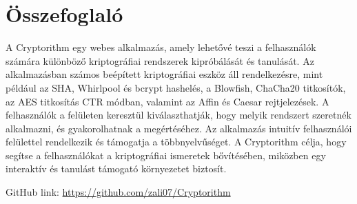 \chapter*{Összefoglaló}

A Cryptorithm egy webes alkalmazás, amely lehetővé teszi a felhasználók számára különböző kriptográfiai rendszerek kipróbálását és tanulását. Az alkalmazásban számos beépített kriptográfiai eszköz áll rendelkezésre, mint például az SHA, Whirlpool és bcrypt hashelés, a Blowfish, ChaCha20 titkosítók, az AES titkosítás CTR módban, valamint az Affin és Caesar rejtjelezések. A felhasználók a felületen keresztül kiválaszthatják, hogy melyik rendszert szeretnék alkalmazni, és gyakorolhatnak a megértéséhez. Az alkalmazás intuitív felhasználói felülettel rendelkezik és támogatja a többnyelvűséget. A Cryptorithm célja, hogy segítse a felhasználókat a kriptográfiai ismeretek bővítésében, miközben egy interaktív és tanulást támogató környezetet biztosít.

GitHub link: \url{https://github.com/zali07/Cryptorithm}